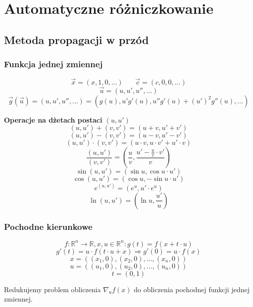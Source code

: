 \documentclass[../mn-notatki.tex]{subfiles}
\begin{document}
\section{Automatyczne różniczkowanie}

\subsection{Metoda propagacji w przód}


\subsubsection{Funkcja jednej zmiennej}
\begin{tcolorbox}
\[
\vec{x} = (x, 1, 0, \ldots) ~~~~~~~~ \vec{c} = (c, 0, 0, \ldots)
\]
\[
\vec{u} = (u, u', u'', \ldots)
\]
\[
\vec{g}(\vec{u}) = (u, u', u'', \ldots)
= (g(u), u'g'(u), u''g'(u) + (u')^2 g''(u), \ldots)
\]
\end{tcolorbox}

\begin{tcolorbox}
\textbf{Operacje na dżetach postaci $(u, u')$}
    $$(u,u') + (v,v') = (u + v, u' + v')$$
    $$(u,u') - (v,v') = (u - v, u' - v')$$
    $$(u,u') \cdot (v,v') = (u \cdot v, u \cdot v' + u' \cdot v)$$
    $$\frac{(u,u')}{(v,v')} = \left(\frac{u}{v}, \frac{u' - \frac{u}{v}\cdot v'}{v}\right)$$
    $$\sin(u,u') = (\sin u, \cos u \cdot u')$$
    $$\cos(u,u') = (\cos u, -\sin u \cdot u')$$
    $$e^{(u,u')} = (e^u, u' \cdot e^u)$$
    $$\ln(u,u') = \left(\ln u, \frac{u'}{u}\right)$$
\end{tcolorbox}

\subsubsection{Pochodne kierunkowe}
\begin{tcolorbox}
\[
f: \mathbb{R}^n \rightarrow \mathbb{R}, x, u \in \mathbb{R}^n:
g(t) = f(x + t \cdot u)
\]
\[
g'(t) = u \cdot f(t \cdot u + x) \Rightarrow g'(0) = u \cdot f(x)
\]
\[
x = ((x_1, 0), (x_2, 0), \ldots, (x_n, 0))
\]
\[
u = ((u_1, 0), (u_2, 0), \ldots, (u_n, 0))
\]
\[
t = (0,1)
\]
\end{tcolorbox}
Redukujemy problem obliczenia $\nabla_u f(x)$ do obliczenia pochodnej funkcji
jednej zmiennej.
\end{document}
